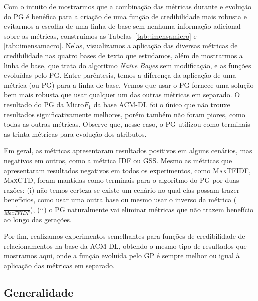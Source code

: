 Com o intuito de mostrarmos que a combinação das métricas durante e evolução do \textsc{PG} é benéfica para a criação de uma função de credibilidade mais robusta e evitarmos a escolha de uma linha de base sem nenhuma informação adicional sobre as métricas, construímos as Tabelas~\ref{tab::imensamicro} e \ref{tab::imensamacro}. 
Nelas, visualizamos a aplicação das diversas métricas de credibilidade nas quatro bases de texto que estudamos, além de mostrarmos a linha de base, que trata do algoritmo \textit{Naïve Bayes} sem modificação, e as funções evoluídas pelo \textsc{PG}. Entre parêntesis, temos a diferença da aplicação de uma métrica (ou \textsc{PG}) para a linha de base.
Vemos que usar o \textsc{PG} fornece uma solução bem mais robusta que usar qualquer um das outras métricas em separado. O resultado do \textsc{PG} da Micro$F_1$ da base \textsc{ACM-DL} foi o único que não trouxe resultados significativamente melhores, porém também não foram piores, como todas as outras métricas.
Observe que, nesse caso, o \textsc{PG} utilizou como terminais as trinta métricas para evolução dos atributos.

Em geral, as métricas apresentaram resultados positivos em alguns cenários, mas negativos em outros, como a métrica \textsc{IDF} ou \textsc{GSS}. Mesmo as métricas que apresentaram resultados negativos em todos os experimentos, como \textsc{MaxTFIDF}, \textsc{MaxCTD}, foram mantidas como terminais para o algoritmo do \textsc{PG} por duas razões: (i) não temos certeza se existe um cenário no qual elas possam trazer benefícios, como usar uma outra base ou mesmo usar o inverso da métrica ($\frac{1}{MaxTFIDF}$), (ii) o \textsc{PG} naturalmente vai eliminar métricas que não trazem benefício ao longo das gerações. 

Por fim, realizamos experimentos semelhantes para funções de credibilidade de relacionamentos na base da \textsc{ACM-DL}, obtendo o mesmo tipo de resultados que mostramos aqui, onde a função evoluída pelo \textsc{GP} é sempre melhor ou igual à aplicação das métricas em separado.





\subsection{Generalidade}
\label{subsec::generalidade}


